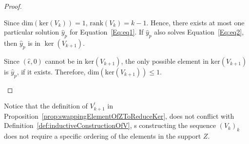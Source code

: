 \documentclass[11pt]{llncs}
\begin{document}
\begin{proof}
\begin{itemize}
\begin{itemize}


Since $\text{dim}(\text{ker}(V_k)) = 1$, $\text{rank}(V_k) = k-1$. Hence, there exists at most one particular solution $\hat{y}_p$ for Equation~\ref{Eq:eq1}. 
If \( \hat{y}_p \) also solves Equation~\ref{Eq:eq2}, then \( \hat{y}_p \) is in \( \ker(V_{k+1}) \).
 
\end{itemize}
Since $(\hat{\epsilon}, 0)$  cannot be in \( \text{ker}(V_{k+1}) \), the only possible element in \( \text{ker}(V_{k+1}) \) is \( \hat{y}_p \), if it exists. Therefore, \( \text{dim}(\text{ker}(V_{k+1})) \leq 1 \).
        \end{itemize}









\end{proof}


\begin{remark}
    Notice that the definition of $V^{'}_{k+1}$ in Proposition~\ref{prop:swappingElementOfZToReduceKer}, does not conflict with Definition~\ref{def:inductiveConstructionOfV}, s constructing the sequence $(V_{k})_k$ does not require a specific ordering of the elements in the support $Z$.   
\end{remark}
\end{document}
